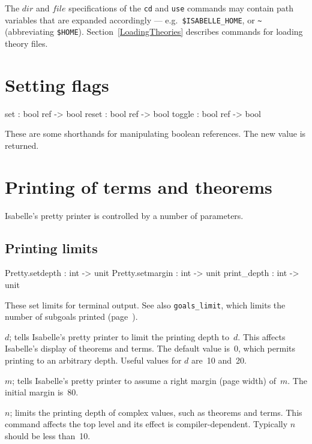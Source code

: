 The $dir$ and $file$ specifications of the \texttt{cd} and
\texttt{use} commands may contain path variables that are expanded
accordingly --- e.g.\ \texttt{\$ISABELLE_HOME}, or \texttt{\~\relax}
(abbreviating \texttt{\$HOME}).  Section~\ref{LoadingTheories}
describes commands for loading theory files.


\section{Setting flags}
\begin{ttbox}
set     : bool ref -> bool
reset   : bool ref -> bool
toggle  : bool ref -> bool
\end{ttbox}
These are some shorthands for manipulating boolean references.  The new
value is returned.


\section{Printing of terms and theorems}\label{sec:printing-control}
Isabelle's pretty printer is controlled by a number of parameters.

\subsection{Printing limits}
\begin{ttbox} 
Pretty.setdepth  : int -> unit
Pretty.setmargin : int -> unit
print_depth      : int -> unit
\end{ttbox}
These set limits for terminal output.  See also {\tt goals_limit}, which
limits the number of subgoals printed (page~\pageref{sec:goals-printing}).

\begin{ttdescription}
\item[\ttindexbold{Pretty.setdepth} \(d\);]  
  tells Isabelle's pretty printer to limit the printing depth to~$d$.  This
  affects Isabelle's display of theorems and terms.  The default value
  is~0, which permits printing to an arbitrary depth.  Useful values for
  $d$ are~10 and~20.

\item[\ttindexbold{Pretty.setmargin} \(m\);]  
  tells Isabelle's pretty printer to assume a right margin (page width)
  of~$m$.  The initial margin is~80.

\item[\ttindexbold{print_depth} \(n\);]  
  limits the printing depth of complex \ML{} values, such as theorems and
  terms.  This command affects the \ML{} top level and its effect is
  compiler-dependent.  Typically $n$ should be less than~10.
\end{ttdescription}


